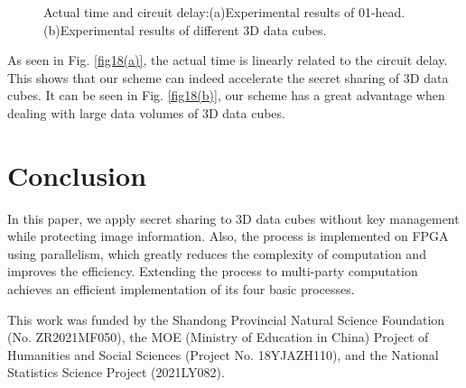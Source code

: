 \begin{figure}[!htb]
	\centering
	\centering
	\caption{Actual time and circuit delay:(a)Experimental results of 01-head. (b)Experimental results of different 3D data cubes.}
	\label{fig18}
\end{figure}

As seen in Fig. \ref{fig18(a)}, the actual time is linearly related to the circuit delay. This shows that our scheme can indeed accelerate the secret sharing of 3D data cubes. It can be seen in Fig. \ref{fig18(b)}, our scheme has a great advantage when dealing with large data volumes of 3D data cubes.

\section{Conclusion}\label{Sec_conclusion}

In this paper, we apply secret sharing to 3D data cubes without key management while protecting image information. Also, the process is implemented on FPGA using parallelism, which greatly reduces the complexity of computation and improves the efficiency. Extending the process to multi-party computation achieves an efficient implementation of its four basic processes.

\begin{acknowledgements}
This work was funded by the Shandong Provincial Natural Science Foundation (No. ZR2021MF050), the MOE (Ministry of Education in China) Project of Humanities and Social Sciences (Project No. 18YJAZH110),  and the National Statistics Science Project (2021LY082).
\end{acknowledgements}


